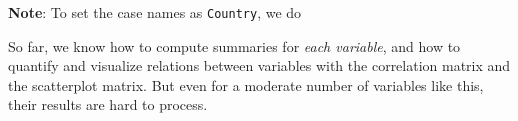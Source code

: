 \documentclass[]{book}
\newenvironment{Shaded}{\begin{snugshade}}{\end{snugshade}}
\newcommand{\KeywordTok}[1]{\textcolor[rgb]{0.13,0.29,0.53}{\textbf{#1}}}
\newcommand{\StringTok}[1]{\textcolor[rgb]{0.31,0.60,0.02}{#1}}
\newcommand{\OtherTok}[1]{\textcolor[rgb]{0.56,0.35,0.01}{#1}}
\newcommand{\OperatorTok}[1]{\textcolor[rgb]{0.81,0.36,0.00}{\textbf{#1}}}
\newcommand{\NormalTok}[1]{#1}
\theoremstyle{definition}
\theoremstyle{definition}
\theoremstyle{definition}
\theoremstyle{remark}
\begin{document}
\textbf{Note}: To set the case names as \texttt{Country}, we do

\begin{Shaded}
\end{Shaded}

So far, we know how to compute summaries for \emph{each variable}, and
how to quantify and visualize relations between variables with the
correlation matrix and the scatterplot matrix. But even for a moderate
number of variables like this, their results are hard to process.
\end{document}
